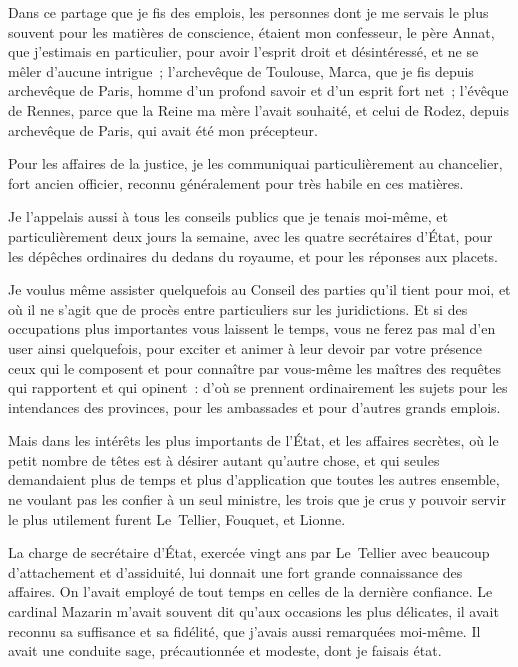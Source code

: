 \documentclass[french,twoside]{book} %
\begin{document}
Dans ce partage que je fis des emplois, les personnes dont je me servais le plus souvent pour les matières de conscience, étaient mon confesseur, le père Annat, que j’estimais en particulier, pour avoir l’esprit droit et désintéressé, et ne se mêler d’aucune intrigue ; l’archevêque de Toulouse, Marca, que je fis depuis archevêque de Paris, homme d’un profond savoir et d’un esprit fort net ; l’évêque de Rennes, parce que la Reine ma mère l’avait souhaité, et celui de Rodez, depuis archevêque de Paris, qui avait été mon précepteur.\par
Pour les affaires de la justice, je les communiquai particulièrement au chancelier, fort ancien officier, reconnu généralement pour très habile en ces matières.\par
Je l’appelais aussi à tous les conseils publics que je tenais moi-même, et particulièrement deux jours la semaine, avec les quatre secrétaires d’État, pour les dépêches ordinaires du dedans du royaume, et pour les réponses aux placets.\par
Je voulus même assister quelquefois au Conseil des parties qu’il tient pour moi, et où il ne s’agit que de procès entre particuliers sur les juridictions. Et si des occupations plus importantes vous laissent le temps, vous ne ferez pas mal d’en user ainsi quelquefois, pour exciter et animer à leur devoir par votre présence ceux qui le composent et pour connaître par vous-même les maîtres des requêtes qui rapportent et qui opinent : d’où se prennent ordinairement les sujets pour les intendances des provinces, pour les ambassades et pour d’autres grands emplois.\par
Mais dans les intérêts les plus importants de l’État, et les affaires secrètes, où le petit nombre de têtes est à désirer autant qu’autre chose, et qui seules demandaient plus de temps et plus d’application que toutes les autres ensemble, ne voulant pas les confier à un seul ministre, les trois que je crus y pouvoir servir le plus utilement furent Le Tellier, Fouquet, et Lionne.\par
La charge de secrétaire d’État, exercée vingt ans par Le Tellier avec beaucoup d’attachement et d’assiduité, lui donnait une fort grande connaissance des affaires. On l’avait employé de tout temps en celles de la dernière confiance. Le cardinal Mazarin m’avait souvent dit qu’aux occasions les plus délicates, il avait reconnu sa suffisance et sa fidélité, que j’avais aussi remarquées moi-même. Il avait une conduite sage, précautionnée et modeste, dont je faisais état.\par
\end{document}
